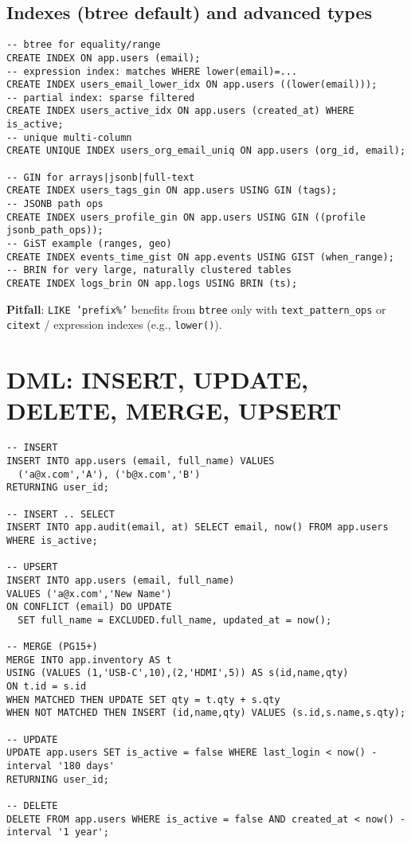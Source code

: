 \documentclass[10pt]{article}
\begin{document}
\subsection{Indexes (btree default) and advanced types}
\begin{lstlisting}[style=psql]
-- btree for equality/range
CREATE INDEX ON app.users (email);
-- expression index: matches WHERE lower(email)=...
CREATE INDEX users_email_lower_idx ON app.users ((lower(email)));
-- partial index: sparse filtered
CREATE INDEX users_active_idx ON app.users (created_at) WHERE is_active;
-- unique multi-column
CREATE UNIQUE INDEX users_org_email_uniq ON app.users (org_id, email);

-- GIN for arrays|jsonb|full-text
CREATE INDEX users_tags_gin ON app.users USING GIN (tags);
-- JSONB path ops
CREATE INDEX users_profile_gin ON app.users USING GIN ((profile jsonb_path_ops));
-- GiST example (ranges, geo)
CREATE INDEX events_time_gist ON app.events USING GIST (when_range);
-- BRIN for very large, naturally clustered tables
CREATE INDEX logs_brin ON app.logs USING BRIN (ts);
\end{lstlisting}
\textbf{Pitfall}: \texttt{LIKE 'prefix\%'} benefits from \texttt{btree} only with \texttt{text\_pattern\_ops} or \texttt{citext} / expression indexes (e.g., \texttt{lower()}).

\section{DML: INSERT, UPDATE, DELETE, MERGE, UPSERT}
\begin{lstlisting}[style=psql]
-- INSERT
INSERT INTO app.users (email, full_name) VALUES
  ('a@x.com','A'), ('b@x.com','B')
RETURNING user_id;

-- INSERT .. SELECT
INSERT INTO app.audit(email, at) SELECT email, now() FROM app.users WHERE is_active;

-- UPSERT
INSERT INTO app.users (email, full_name)
VALUES ('a@x.com','New Name')
ON CONFLICT (email) DO UPDATE
  SET full_name = EXCLUDED.full_name, updated_at = now();

-- MERGE (PG15+)
MERGE INTO app.inventory AS t
USING (VALUES (1,'USB-C',10),(2,'HDMI',5)) AS s(id,name,qty)
ON t.id = s.id
WHEN MATCHED THEN UPDATE SET qty = t.qty + s.qty
WHEN NOT MATCHED THEN INSERT (id,name,qty) VALUES (s.id,s.name,s.qty);

-- UPDATE
UPDATE app.users SET is_active = false WHERE last_login < now() - interval '180 days'
RETURNING user_id;

-- DELETE
DELETE FROM app.users WHERE is_active = false AND created_at < now() - interval '1 year';
\end{lstlisting}
\end{document}
